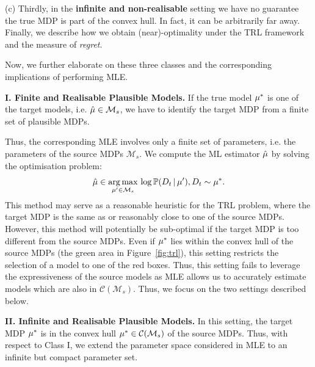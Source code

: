 (c) Thirdly, in the \textbf{infinite and non-realisable} setting we have no guarantee the true MDP is part of the convex hull. In fact, it can be arbitrarily far away. Finally, we describe how we obtain (near)-optimality under the TRL framework and the measure of \emph{regret}.
\fi

Now, we further elaborate on these three classes and the corresponding implications of performing MLE.

\textbf{I. Finite and Realisable Plausible Models.}\label{subsec:finite}
If the true model $\mu^{*}$ is one of the target models, i.e. $\hat{\mu} \in \mathcal{M}_s$, we have to identify the target MDP from a finite set of plausible MDPs.

Thus, the corresponding MLE involves only a finite set of parameters, i.e. the parameters of the source MDPs $\mathcal{M}_s$. We compute the ML estimator $\hat{\mu}$ by solving the optimisation problem:
\begin{equation}
    \hat{\mu} \in \underset{\mu' \in \mathcal{M}_s}{\arg\max} \, \log \mathbb{P}(D_t \, | \, \mu'), D_t \sim \mu^{*}.
\end{equation}
This method may serve as a reasonable heuristic for the TRL problem, where the target MDP is the same as or reasonably close to one of the source MDPs. However, this method will potentially be sub-optimal if the target MDP is too different from the source MDPs. %
Even if $\mu^{*}$ lies within the convex hull of the source MDPs (the green area in Figure~\ref{fig:trl}), this setting restricts the selection of a model to one of the red boxes. Thus, this setting fails to leverage the expressiveness of the source models as MLE allows us to accurately estimate models which are also in $\mathcal{C}(\mathcal{M}_s)$. Thus, we focus on the two settings described below.

\textbf{II. Infinite and Realisable Plausible Models.}\label{subsec:realisable}
In this setting, the target MDP $\mu^{*}$ is in the convex hull $\mu^{*} \in \mathcal{C}(\mathcal{M}_s)$ of the source MDPs. Thus, with respect to Class I, we extend the parameter space considered in MLE to an infinite but compact parameter set. 

